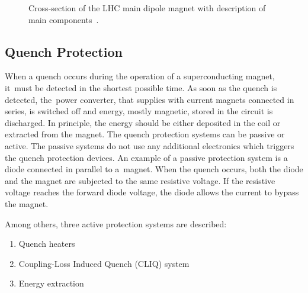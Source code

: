 \begin{figure}[H]
    \centering
    \caption{Cross-section of the LHC main dipole magnet with description of main components~\cite{lhc_main_dipole_cross_section}.}
    \label{fig:cross_section_lhc_main_dipole}
\end{figure}

\subsection{Quench Protection}

When a quench occurs during the operation of a superconducting magnet, it~must be detected in the shortest possible time. As soon as the quench is detected, the~power converter, that supplies with current magnets connected in series, is switched off and energy, mostly magnetic, stored in the circuit is discharged. In principle, the energy should be either deposited in the coil or extracted from the magnet. The quench protection systems can be passive or active. The passive systems do not use any additional electronics which triggers the quench protection devices. An example of a passive protection system is a diode connected in parallel to a~magnet. When the quench occurs, both the diode and the magnet are subjected to the same resistive voltage. If the resistive voltage reaches the forward diode voltage, the diode allows the current to bypass the magnet.

Among others, three active protection systems are described: 

\begin{enumerate}
    \item Quench heaters
	\item Coupling-Loss Induced Quench (CLIQ) system
	\item Energy extraction
\end{enumerate}

